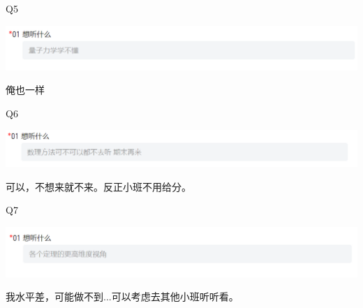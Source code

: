 \documentclass{beamer}
\begin{document}
\begin{frame}{Q5}
    \begin{center}
        \includegraphics[width=1.0\textwidth]{figures/q5.png} %
    \end{center}
    俺也一样

\end{frame}

\begin{frame}{Q6}
    \begin{center}
        \includegraphics[width=1.0\textwidth]{figures/q6.png} %
    \end{center}
    可以，不想来就不来。反正小班不用给分。

\end{frame}

\begin{frame}{Q7}
    \begin{center}
        \includegraphics[width=1.0\textwidth]{figures/q7.png} %
    \end{center}
    我水平差，可能做不到...可以考虑去其他小班听听看。

\end{frame}
\end{document}
